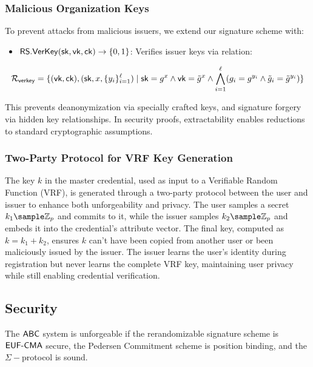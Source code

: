 \subsubsection{Malicious Organization Keys}
To prevent attacks from malicious issuers, we extend our signature scheme with:
\begin{itemize}
    \item $\mathsf{RS.VerKey}(\mathsf{sk}, \mathsf{vk}, \mathsf{ck}) \to \{0,1\}$: Verifies issuer keys via relation:
\end{itemize}
\[
\mathcal{R}_{\mathsf{verkey}} = \{(\mathsf{vk}, \mathsf{ck}),(\mathsf{sk}, x, \{y_i\}_{i=1}^\ell) \mid \mathsf{sk} = g^x \wedge \mathsf{vk} = \tilde{g}^x \wedge \bigwedge_{i=1}^\ell (g_i = g^{y_i} \wedge \tilde{g}_i = \tilde{g}^{y_i})\}
\]

This prevents deanonymization via specially crafted keys, and signature forgery via hidden key relationships. In security proofs, extractability enables reductions to standard cryptographic assumptions.

\subsubsection{Two-Party Protocol for VRF Key Generation}
The key $k$ in the master credential, used as input to a Verifiable Random Function (VRF), is generated through a two-party protocol between the user and issuer to enhance both unforgeability and privacy. The user samples a secret $k_1 \sample \mathbb{Z}_p$ and commits to it, while the issuer samples $k_2 \sample \mathbb{Z}_p$ and embeds it into the credential's attribute vector. The final key, computed as $k = k_1 + k_2$, ensures $k$ can't have been copied from another user or been maliciously issued by the issuer. The issuer learns the user's identity during registration but never learns the complete VRF key, maintaining user privacy while still enabling credential verification.


\subsection{Security}
\begin{theorem}[Unforgeability]
The $\mathsf{ABC}$ system is unforgeable if the rerandomizable signature scheme is $\mathsf{EUF\text{-}CMA}$ secure, the Pedersen Commitment scheme is position binding, and the $\Sigma-$protocol is sound.
\end{theorem}

